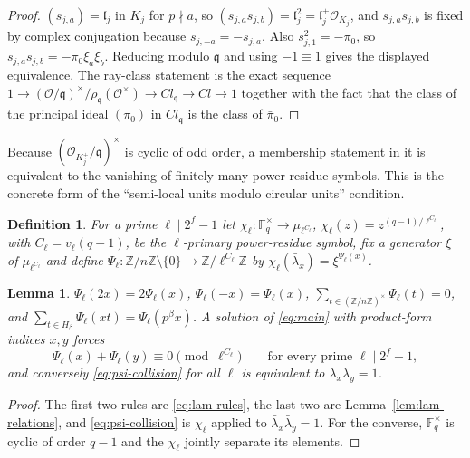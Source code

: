 \documentclass[a4paper]{article}
\newtheorem{lemma}[theorem]{Lemma}
\newtheorem{definition}[theorem]{Definition}
\newcommand{\F}{\mathbb{F}}
\newcommand{\Z}{\mathbb{Z}}
\begin{document}
\begin{proof}
	$(s_{j,a})=\mathfrak l_j$ in $K_j$ for $p\nmid a$, so
	$(s_{j,a}s_{j,b})=\mathfrak l_j^{2}=\mathfrak l_j^{+}\mathcal O_{K_j}$,
	and $s_{j,a}s_{j,b}$ is fixed by complex conjugation because
	$s_{j,-a}=-s_{j,a}$.
	Also $s_{j,1}^{2}=-\pi_0$, so
	$s_{j,a}s_{j,b}=-\pi_0\xi_a\xi_b$.  Reducing modulo $\mathfrak q$ and
	using $-1\equiv1$ gives the displayed equivalence.
	The ray-class statement is the exact sequence
	$1\to(\mathcal O/\mathfrak q)^{\times}/
	\rho_{\mathfrak q}(\mathcal O^{\times})\to Cl_{\mathfrak q}\to Cl\to1$
	together with the fact that the class of the principal ideal
	$(\pi_0)$ in $Cl_{\mathfrak q}$ is the class of $\bar\pi_0$.
\end{proof}

Because $(\mathcal O_{K_j^{+}}/\mathfrak q)^{\times}$ is cyclic of odd
order, a membership statement in it is equivalent to the vanishing of
finitely many power-residue symbols.  This is the concrete form of the
``semi-local units modulo circular units'' condition.

\begin{definition}\label{def:psiell}
	For a prime $\ell\mid2^{f}-1$ let
	$\chi_\ell:\F_q^{\times}\to\mu_{\ell^{C_\ell}}$,
	$\chi_\ell(z)=z^{(q-1)/\ell^{C_\ell}}$, with
	$C_\ell=v_\ell(q-1)$, be the $\ell$-primary power-residue symbol, fix a
	generator $\xi$ of $\mu_{\ell^{C_\ell}}$ and define
	$\Psi_\ell:\Z/n\Z\setminus\{0\}\to\Z/\ell^{C_\ell}\Z$ by
	$\chi_\ell(\bar\lambda_x)=\xi^{\Psi_\ell(x)}$.
\end{definition}

\begin{lemma}\label{lem:psi-rules}
	$\Psi_\ell(2x)=2\Psi_\ell(x)$, $\Psi_\ell(-x)=\Psi_\ell(x)$,
	$\sum_{t\in(\Z/n\Z)^{\times}}\Psi_\ell(t)=0$, and
	$\sum_{t\in H_\beta}\Psi_\ell(xt)=\Psi_\ell(p^{\beta}x)$.
	A solution of \eqref{eq:main} with product-form indices $x,y$ forces
	\begin{equation}\label{eq:psi-collision}
		\Psi_\ell(x)+\Psi_\ell(y)\equiv0
		\pmod{\ell^{C_\ell}}\qquad\text{for every prime }\ell\mid2^{f}-1 ,
	\end{equation}
	and conversely \eqref{eq:psi-collision} for all $\ell$ is equivalent to
	$\bar\lambda_x\bar\lambda_y=1$.
\end{lemma}

\begin{proof}
	The first two rules are \eqref{eq:lam-rules}, the last two are
	Lemma~\ref{lem:lam-relations}, and \eqref{eq:psi-collision} is
	$\chi_\ell$ applied to $\bar\lambda_x\bar\lambda_y=1$.
	For the converse, $\F_q^{\times}$ is cyclic of order $q-1$ and the
	$\chi_\ell$ jointly separate its elements.
\end{proof}
\end{document}
